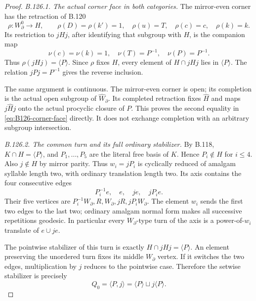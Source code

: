 \begin{proof}
\emph{B.126.1. The actual corner face in both categories.}
The mirror-even corner has the retraction of B.120
\[
 \rho:W_\partial^0\longrightarrow H,
 \qquad \rho(D)=\rho(k')=1,\quad\rho(u)=T,
 \quad\rho(c)=c,\quad\rho(k)=k.
\]
Its restriction to $jHj$, after identifying that subgroup with $H$,
is the companion map
\[
 \nu(c)=\nu(k)=1,\quad\nu(T)=P^{-1},\quad\nu(P)=P^{-1}.
\]
Thus $\rho(jHj)=\langle P\rangle$. Since $\rho$ fixes $H$,
every element of $H\cap jHj$ lies in $\langle P\rangle$.
The relation $jPj=P^{-1}$ gives the reverse inclusion.

The same argument is continuous. The mirror-even corner is open;
its completion is the actual open subgroup of
$\widehat W_\partial$. Its completed retraction fixes
$\widehat H$ and maps $j\widehat H j$ onto the actual procyclic
closure of $P$. This proves the second equality in
\eqref{eq:B126-corner-face} directly. It does not exchange
completion with an arbitrary subgroup intersection.

\emph{B.126.2. The common turn and its full ordinary stabilizer.}
By B.118, $K\cap H=\langle P\rangle$, and
$P_1,\ldots,P_5$ are the literal free basis of $K$.
Hence $P_i\notin H$ for $i\leq4$. Also $j\notin H$ by mirror
parity. Thus $w_i=jP_i$ is cyclically reduced of amalgam syllable
length two, with ordinary translation length two.
Its axis contains the four consecutive edges
\begin{equation}\label{eq:B126-four-edges}
 P_i^{-1}e,\quad e,\quad je,\quad jP_i e.
\end{equation}
Their five vertices are
$P_i^{-1}W_\partial,R,W_\partial,jR,jP_iW_\partial$.
The element $w_i$ sends the first two edges to the last two;
ordinary amalgam normal form makes all successive repetitions
geodesic. In particular every $W_\partial$-type turn of the axis
is a power-of-$w_i$ translate of $e\cup je$.

The pointwise stabilizer of this turn is exactly
$H\cap jHj=\langle P\rangle$. An element preserving the unordered
turn fixes its middle $W_\partial$ vertex. If it switches the two
edges, multiplication by $j$ reduces to the pointwise case.
Therefore the setwise stabilizer is precisely
\begin{equation}\label{eq:B126-turn-stabilizer}
 Q_0=\langle P,j\rangle
     =\langle P\rangle\sqcup j\langle P\rangle.
\end{equation}


\end{proof}
